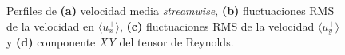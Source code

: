 \begin{figure}[H]
 \centering
    
 \caption{Perfiles de \textbf{(a)} velocidad media \textit{streamwise}, \textbf{(b)} fluctuaciones RMS de la velocidad en $\langle u^+_x \rangle$, \textbf{(c)} fluctuaciones RMS de la velocidad $\langle u^+_y \rangle$ y \textbf{(d)} componente \textit{XY} del tensor de Reynolds. } 
 \label{fig:kim_1}
\end{figure}

